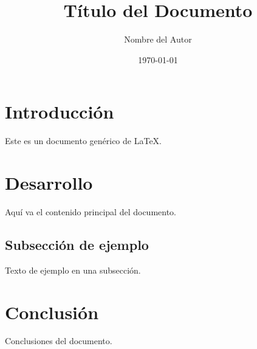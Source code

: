 \documentclass[12pt]{article}
\title{Título del Documento}
\author{Nombre del Autor}
\date{\today}
\begin{document}
\maketitle

\section{Introducción}
Este es un documento genérico de LaTeX.

\section{Desarrollo}
Aquí va el contenido principal del documento.

\subsection{Subsección de ejemplo}
Texto de ejemplo en una subsección.

\section{Conclusión}
Conclusiones del documento.
\end{document}

